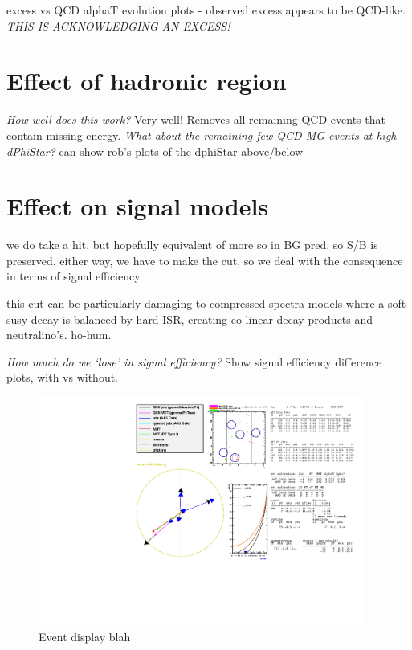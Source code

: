 excess vs QCD alphaT evolution plots - observed excess appears to be QCD-like.
\emph{THIS IS ACKNOWLEDGING AN EXCESS!}

\section{Effect of hadronic region}

\emph{How well does this work?} Very well! Removes all remaining QCD events that
contain missing energy. \emph{What about the remaining few QCD MG events at high
dPhiStar?} can show rob's plots of the dphiStar above/below

\section{Effect on signal models}
we do take a hit, but hopefully equivalent of more so in BG pred, so S/B is
preserved. either way, we have to make the cut, so we deal with the consequence
in terms of signal efficiency.

this cut can be particularly damaging to compressed spectra models where a
soft susy decay is balanced by hard ISR, creating co-linear decay products and
neutralino's. ho-hum.

\emph{How much do we `lose' in signal efficiency?} Show signal efficiency
difference plots, with vs without.

\clearpage

\begin{figure}
    \centering
    \includegraphics[width=0.95\textwidth]
    {Figs/eventDisplays/Had_QCD_MG_MC_HT375_skim_displays_singleEvent.pdf}
    \caption{Event display blah}
    \label{fig:event_display_QCD}
\end{figure}
